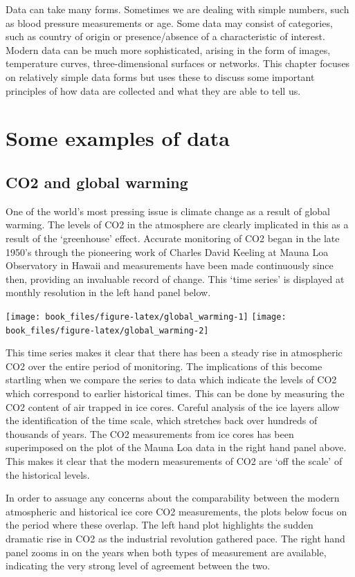 \documentclass[
]{book}
\begin{document}
Data can take many forms. Sometimes we are dealing with simple numbers, such as blood pressure measurements or age. Some data may consist of categories, such as country of origin or presence/absence of a characteristic of interest. Modern data can be much more sophisticated, arising in the form of images, temperature curves, three-dimensional surfaces or networks. This chapter focuses on relatively simple data forms but uses these to discuss some important principles of how data are collected and what they are able to tell us.

\section{Some examples of data}\label{examples-data}

\subsection{CO2 and global warming}\label{co2-and-global-warming}

One of the world's most pressing issue is climate change as a result of global warming. The levels of CO2 in the atmosphere are clearly implicated in this as a result of the `greenhouse' effect. Accurate monitoring of CO2 began in the late 1950's through the pioneering work of Charles David Keeling at Mauna Loa Observatory in Hawaii and measurements have been made continuously since then, providing an invaluable record of change. This `time series' is displayed at monthly resolution in the left hand panel below.

\texttt{[image: book\_files/figure-latex/global\_warming-1]} \texttt{[image: book\_files/figure-latex/global\_warming-2]}

This time series makes it clear that there has been a steady rise in atmospheric CO2 over the entire period of monitoring. The implications of this become startling when we compare the series to data which indicate the levels of CO2 which correspond to earlier historical times. This can be done by measuring the CO2 content of air trapped in ice cores. Careful analysis of the ice layers allow the identification of the time scale, which stretches back over hundreds of thousands of years. The CO2 measurements from ice cores has been superimposed on the plot of the Mauna Loa data in the right hand panel above. This makes it clear that the modern measurements of CO2 are `off the scale' of the historical levels.

In order to assuage any concerns about the comparability between the modern atmospheric and historical ice core CO2 measurements, the plots below focus on the period where these overlap. The left hand plot highlights the sudden dramatic rise in CO2 as the industrial revolution gathered pace. The right hand panel zooms in on the years when both types of measurement are available, indicating the very strong level of agreement between the two.
\end{document}
